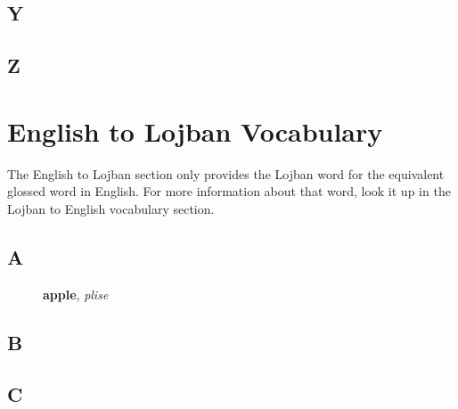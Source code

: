 \documentclass[12pt]{book}
\begin{document}
\begin{description}
\item[ ]
\end{description}

\subsection{Y}

\begin{description}
\item[ ]
\end{description}

\subsection{Z}

\begin{description}
\item[ ]
\end{description}



\section{English to Lojban Vocabulary}

The English to Lojban section only provides the Lojban word for the equivalent glossed word in English. For more information about that word, look it up in the Lojban to English vocabulary section.

\subsection{A}

\begin{description}
\item[ ] \textbf{apple}, \textit{plise} 
\end{description}

\subsection{B}

\begin{description}
\item[ ]
\end{description}

\subsection{C}
\end{document}
